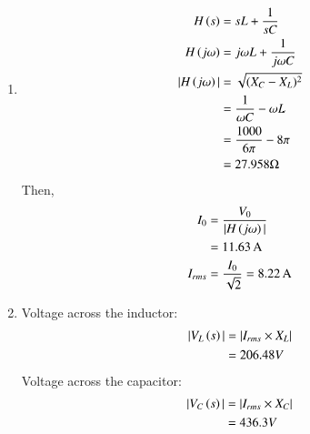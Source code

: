\documentclass[a4,12pt,onecolumn]{IEEEtran}
\begin{document}
\begin{enumerate}
    \item 
    \begin{align}
    H\left(s\right) &= sL + \frac{1}{sC}\\
    H\left(j\omega\right) &= j\omega L + \frac{1}{j\omega C}\\
    |H\left(j\omega\right)| &=\sqrt{(X_C - X_L)^2} \\
    &= \frac{1}{\omega C} - \omega L \\
    &= \frac{1000}{6\pi}- 8\pi \\
    &= 27.958\Omega   
    \end{align}
    Then,
    \begin{align}
        I_0 &= \frac{V_0}{|H\left(j\omega\right)|} \\
        &= 11.63\, \text{A} \\
        I_{rms} &= \frac{I_0}{\sqrt{2}} = 8.22\, \text{A}
    \end{align}
    
    \item Voltage across the inductor:
    \begin{align}
        |V_L\left(s\right)| &= |I_{rms} \times X_L| \\
        &= 206.48V
    \end{align}
    Voltage across the capacitor:
    \begin{align}
       |V_C\left(s\right)| &= |I_{rms} \times X_C| \\
        &= 436.3V
    \end{align}


\end{enumerate}
\end{document}
